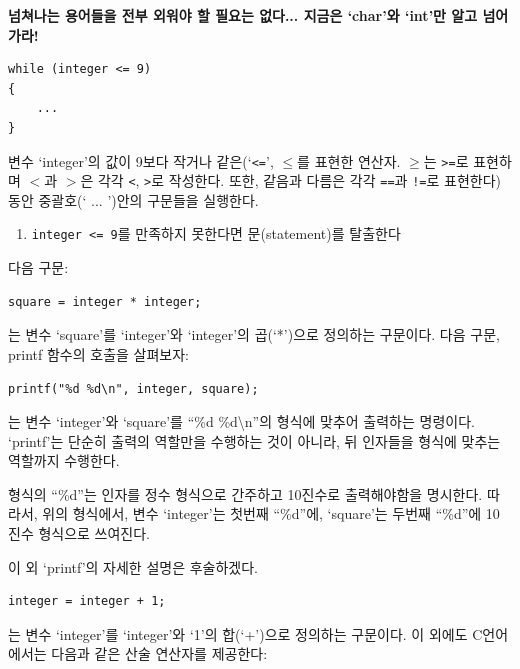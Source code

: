 \documentclass[a4paper,12pt]{book}
\newcommand{\V}[1]{\Verb|#1|}
\begin{document}
\textbf{
    넘쳐나는 용어들을 전부 외워야 할 필요는 없다...
    지금은 `char'와 `int'만 알고 넘어가라!
}

\begin{lstlisting}
while (integer <= 9)
{
    ...
}
\end{lstlisting}

변수 `integer'의 값이 9보다 작거나 같은(`\verb+<=+', $\le$를 표현한 연산자. 
$\ge$는 \V{>=}로 표현하며 $<$과 $>$은 각각 \V{<}, \V{>}로 작성한다.
또한, 같음과 다름은 각각 \V{==}과 \V{!=}로 표현한다) 동안
중괄호(`{ ... }')안의 구문들을 실행한다.

\begin{enumerate}
    \item \V{integer <= 9}를 만족하지 못한다면 문(statement)를 탈출한다
\end{enumerate}

다음 구문:

\begin{lstlisting}
square = integer * integer;
\end{lstlisting}

는 변수 `square'를 `integer'와 `integer'의 곱(`*')으로 정의하는 구문이다.
다음 구문, printf 함수의 호출을 살펴보자:

\begin{lstlisting}
printf("%d %d\n", integer, square);
\end{lstlisting}

는 변수 `integer'와 `square'를 ``\%d \%d\textbackslash{}n''의 형식에 맞추어 출력하는 명령이다.
`printf'는 단순히 출력의 역할만을 수행하는 것이 아니라,
뒤 인자들을 형식에 맞추는 역할까지 수행한다.

형식의 ``\%d''는 인자를 정수 형식으로 간주하고 10진수로 출력해야함을 명시한다.
따라서, 위의 형식에서, 변수 `integer'는 첫번째 ``\%d''에,
`square'는 두번째 ``\%d''에 10진수 형식으로 쓰여진다.

이 외 `printf'의 자세한 설명은 후술하겠다.

\begin{lstlisting}
integer = integer + 1;
\end{lstlisting}

는 변수 `integer'를 `integer'와 `1'의 합(`+')으로 정의하는 구문이다.
이 외에도 C언어에서는 다음과 같은 산술 연산자를 제공한다:
\end{document}
